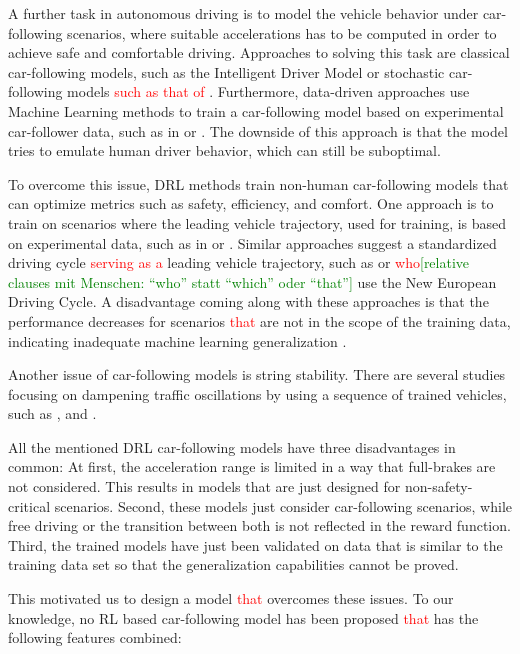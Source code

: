 \documentclass[review]{elsarticle}
\providecommand{\red}[1]{\textcolor{red}{#1}}
\providecommand{\green}[1]{\textcolor{green}{#1}}
\providecommand{\martin}[1]{\red{#1}} %
\providecommand{\martinc}[1]{\green{[#1]}} %
\providecommand{\3}{{\ss}}
\begin{document}
A further task in autonomous driving is to model the vehicle behavior
under car-following scenarios, where suitable accelerations has to be
computed in order to achieve safe and comfortable driving. Approaches
to solving this task are classical car-following models, such as the
Intelligent Driver Model \cite{Opus} or stochastic car-following
models \martin{such as that of} \cite{Treiber2018stochIDM_TRB}. Furthermore, data-driven approaches use Machine Learning methods to train a car-following model based on experimental car-follower data, such as in \cite{Chong2011SimulationOD} or \cite{ZHOU2017245}. The downside of this approach is that the model tries to emulate human driver behavior, which can still be suboptimal.

To overcome this issue, DRL methods train non-human car-following models that can optimize metrics such as safety, efficiency, and comfort. 
One approach is to train on scenarios where the leading vehicle
trajectory, used for training, is based on experimental data, such as
in \cite{SafeEfficientAndComfortable} or
\cite{HumanLikeAutonomouCF}. Similar approaches suggest a standardized
driving cycle \martin{serving as a} leading vehicle trajectory, such
as \cite{ComparisonRLvsMPC} or \cite{CFelectricVehicle}
\martin{who}\martinc{relative clauses mit Menschen: ``who'' statt
  ``which'' oder ``that''} use the New European Driving Cycle.
A disadvantage coming along with these approaches is that the
performance decreases for scenarios \martin{that} are not in the scope of the training data, indicating inadequate machine learning generalization \cite{ComparisonRLvsMPC}. 

Another issue of car-following models is string stability. There are several studies focusing on dampening traffic oscillations by using a sequence of trained vehicles, such as \cite{qu2020jointly}, \cite{DissipatingStopAndGoWaves} and \cite{DampenStopAndGoTraffic}.

All the mentioned DRL car-following models have three disadvantages in common: At first, the acceleration range is limited in a way that full-brakes are not considered. This results in models that are just designed for non-safety-critical scenarios. Second, these models just consider car-following scenarios, while free driving or the transition between both is not reflected in the reward function. Third, the trained models have just been validated on data that is similar to the training data set so that the generalization capabilities cannot be proved. 

This motivated us to design a model \martin{that} overcomes these issues.
To our knowledge, no RL based car-following model has been proposed \martin{that} has the following features combined:
\end{document}
